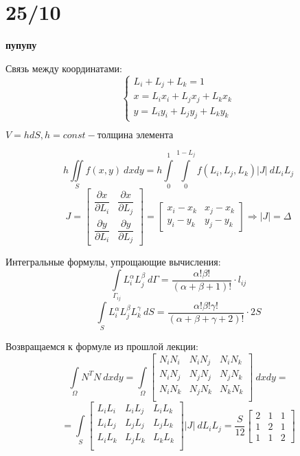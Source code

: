 \documentclass{bmstu}
\begin{document}
	
	\section*{25/10}
	\begin{center}
		\textbf{пупупу}
	\end{center}
	
	
	Связь между координатами:
	\[
	\begin{cases}
		L_i+L_j+L_k=1 \\
		x=L_ix_i+L_jx_j+L_kx_k \\
		y=L_iy_i+L_jy_j+L_ky_k
	\end{cases}
	\]
	
	$V=hdS, h=const-\text{толщина элемента}$
	
	\[
	h\iint\limits_Sf(x,y)\ dxdy= h\int\limits_0^1\int\limits_0^{1-L_j} f(L_i,L_j,L_k)|J|\ dL_iL_j
	\]
	\[
	J=\begin{bmatrix}
		\dfrac{\partial x}{\partial L_i} & \dfrac{\partial x}{\partial L_j} \\
		
		\dfrac{\partial y}{\partial L_i} & \dfrac{\partial y}{\partial L_j}
	\end{bmatrix} = \begin{bmatrix}
	x_i-x_k & x_j-x_k \\
	y_i-y_k & y_j-y_k
	\end{bmatrix} \Rightarrow |J|=\Delta
	\]
	
	
	Интегральные формулы, упрощающие вычисления:
	\[
	\int\limits_{\Gamma_{ij}} L_i^{\alpha}L_j^{\beta} \ d\Gamma = \frac{\alpha!\beta!}{(\alpha+\beta+1)!}\cdot l_{ij}
	\]
	\[
		\int\limits_{S} L_i^{\alpha}L_j^{\beta}L_k^{\gamma} \ dS = \frac{\alpha!\beta!\gamma!}{(\alpha+\beta+\gamma+2)!}\cdot 2S \tag{1}
	\]
	
	
	Возвращаемся к формуле из прошлой лекции:
	\[
	\int\limits_{\Omega}  N^T N\ dx dy = \int\limits_{\Omega}  
	\begin{bmatrix}
		N_iN_i & N_iN_j & N_iN_k \\
		N_iN_j & N_jN_j & N_jN_k \\
		N_iN_k & N_jN_k & N_kN_k \\
	\end{bmatrix}
	\ dx dy = 
	\]
	\[
	= \int\limits_S \begin{bmatrix}
		L_iL_i & L_iL_j & L_iL_k \\
		L_iL_j & L_jL_j & L_jL_k \\
		L_iL_k & L_jL_k & L_kL_k \\
	\end{bmatrix} |J| \ dL_i L_j = \dfrac{S}{12} \begin{bmatrix}
	2 & 1 & 1 \\ 1 & 2 & 1 \\ 1 & 1 & 2
	\end{bmatrix}
	\]
	
\end{document}
